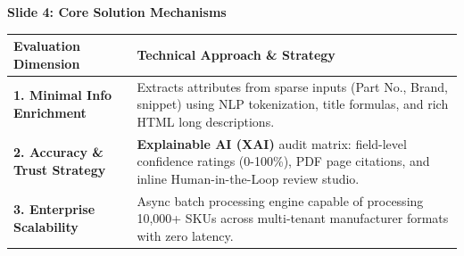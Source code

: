 \documentclass[aspectratio=169, 10pt]{beamer}
\begin{document}
\begin{frame}{\textbf{Slide 4: Core Solution Mechanisms}}
  \begin{center}
    \small
    \begin{tabular}{p{4cm} p{8.5cm}}
      \toprule
      \textbf{Evaluation Dimension} & \textbf{Technical Approach \& Strategy} \\
      \midrule
      \textbf{1. Minimal Info Enrichment} & Extracts attributes from sparse inputs (Part No., Brand, snippet) using NLP tokenization, title formulas, and rich HTML long descriptions. \\
      \rowcolor{gray!10}
      \textbf{2. Accuracy \& Trust Strategy} & \textbf{Explainable AI (XAI)} audit matrix: field-level confidence ratings (0-100\%), PDF page citations, and inline Human-in-the-Loop review studio. \\
      \textbf{3. Enterprise Scalability} & Async batch processing engine capable of processing 10,000+ SKUs across multi-tenant manufacturer formats with zero latency. \\
      \bottomrule
    \end{tabular}
  \end{center}
\end{frame}
\end{document}
